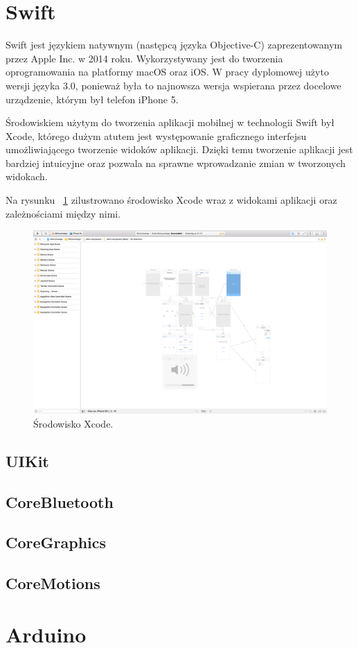 \section{Swift}
Swift jest językiem natywnym (następcą języka Objective-C) zaprezentowanym przez Apple Inc. w 2014 roku. Wykorzystywany jest do tworzenia oprogramowania na platformy macOS oraz iOS. W pracy dyplomowej użyto wersji języka 3.0, ponieważ była to najnowsza wersja wspierana przez docelowe urządzenie, którym był telefon iPhone 5.

Środowiskiem użytym do tworzenia aplikacji mobilnej w technologii Swift był Xcode, którego dużym atutem jest występowanie graficznego interfejsu umożliwiającego tworzenie widoków aplikacji. Dzięki temu tworzenie aplikacji jest bardziej intuicyjne oraz pozwala na sprawne wprowadzanie zmian w tworzonych widokach.

Na rysunku ~\ref{fig:xcode} zilustrowano środowisko Xcode wraz z widokami aplikacji oraz zależnościami między nimi.   

\begin{figure}[H]
	\centering
		\includegraphics[width=0.75\linewidth]{pic02/xcode}
	\caption{Środowisko Xcode.}
	\label{fig:xcode}	
\end{figure}

\subsection{UIKit}
\subsection{CoreBluetooth}
\subsection{CoreGraphics}
\subsection{CoreMotions}

\section{Arduino}
